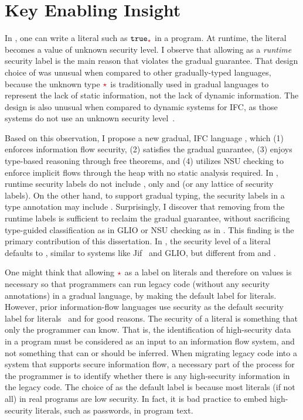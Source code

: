 \section{Key Enabling Insight}
\label{sec:insight}

In \GSLRef{}, one can write a literal such as $\true_{\unk}$ in a program. At
runtime, the literal becomes a value of unknown security level. I observe that
allowing \unk as a \emph{runtime} security label is the main reason that \GSLRef
violates the gradual guarantee. That design choice of \GSLRef was unusual when
compared to other gradually-typed languages, because the unknown type $\unk$ is
traditionally used in gradual languages to represent the lack of static
information, not the lack of dynamic information. The design is also unusual
when compared to dynamic systems for IFC, as those systems do not use an unknown
security
level~\parencite{Askarov:2009vq,austin2009efficient,Devriese:2010up,stefan2011flexible,Austin:2017uh}.

Based on this observation, I propose a new gradual, IFC language \Surface, which
(1) enforces information flow security, (2) satisfies the gradual guarantee, (3)
enjoys type-based reasoning through free theorems, and (4) utilizes NSU checking
to enforce implicit flows through the heap with no static analysis required. In
\Surface, runtime security labels do not include \unk, only \low and \high (or
any lattice of security labels). On the other hand, to support gradual typing,
the security labels in a type annotation may include \unk. Surprisingly, I
discover that removing \unk from the runtime labels is sufficient to reclaim the
gradual guarantee, without sacrificing type-guided classification as in GLIO or
NSU checking as in \WHILEG. This finding is the primary contribution of this
dissertation. In \Surface, the security level of a literal defaults to \low,
similar to systems like Jif~\parencite{Myers:2006aa} and GLIO, but different
from \GSLRef and \WHILEG.

One might think that allowing $\unk$ as a label on literals and therefore on
values is necessary so that programmers can run legacy code (without any
security annotations) in a gradual language, by making \unk the default label
for literals. However, prior information-flow languages use \low security as the
default security label for literals~\parencite{Myers:2006aa} and for good
reasons. The security of a literal is something that only the programmer can
know. That is, the identification of high-security data in a program must be
considered as an input to an information flow system, and not something that can
or should be inferred. When migrating legacy code into a system that supports
secure information flow, a necessary part of the process for the programmer is
to identify whether there is any high-security information in the legacy code.
The choice of \low as the default label is because most literals (if not all) in
real programs are low security. In fact, it is bad practice to embed
high-security literals, such as passwords, in program text.

